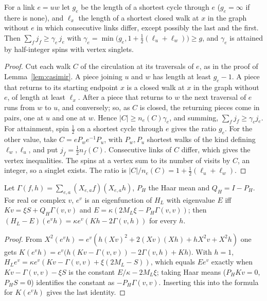 \begin{remark}\label{rem:perlink}
For a link $e=uw$ let $g_e$ be the length of a shortest cycle through $e$ ($g_e=\infty$ if there is none), and $\ell_x$ the length of a shortest closed walk at $x$ in the graph without $e$ in which consecutive links differ, except possibly the last and the first. Then $\sum_fj_f\ge\gamma_e\,j_e$ with $\gamma_e=\min\bigl(g_e,1+\frac12(\ell_u+\ell_w)\bigr)\ge g$, and $\gamma_e$ is attained by half-integer spins with vertex singlets.
\end{remark}
\begin{proof}
Cut each walk $C$ of the circulation at its traversals of $e$, as in the proof of Lemma~\ref{lem:casimir}. A piece joining $u$ and $w$ has length at least $g_e-1$. A piece that returns to its starting endpoint $x$ is a closed walk at $x$ in the graph without $e$, of length at least $\ell_x$. After a piece that returns to $w$ the next traversal of $e$ runs from $w$ to $u$, and conversely; so, as $C$ is closed, the returning pieces come in pairs, one at $u$ and one at $w$. Hence $|C|\ge n_e(C)\gamma_e$, and summing, $\sum_fj_f\ge\gamma_ej_e$.
For attainment, spin $\frac12$ on a shortest cycle through $e$ gives the ratio $g_e$. For the other value, take $C=eP_we^{-1}P_u$, with $P_w,P_u$ shortest walks of the kind defining $\ell_w,\ell_u$, and put $j_f=\frac12n_f(C)$. Consecutive links of $C$ differ, which gives the vertex inequalities. The spins at a vertex sum to its number of visits by $C$, an integer, so a singlet exists. The ratio is $|C|/n_e(C)=1+\frac12(\ell_u+\ell_w)$.
\end{proof}

\begin{lemma}\label{lem:gst}
Let $\Gamma(f,h)=\sum_{e,a}(X_{e,a}f)(X_{e,a}h)$, $P_H$ the Haar mean and $Q_H=I-P_H$. For real or complex $v$, $e^v$ is an eigenfunction of $H_L$ with eigenvalue $E$ iff $Kv=\xi S+Q_H\Gamma(v,v)$ and $E=\kappa(2M_L\xi-P_H\Gamma(v,v))$; then $(H_L-E)(e^vh)=\kappa e^v(Kh-2\Gamma(v,h))$ for every $h$.
\end{lemma}
\begin{proof}
From $X^2(e^vh)=e^v(h(Xv)^2+2(Xv)(Xh)+hX^2v+X^2h)$ one gets $K(e^vh)=e^v\bigl(h(Kv-\Gamma(v,v))-2\Gamma(v,h)+Kh\bigr)$. With $h=1$, $H_Le^v=\kappa e^v(Kv-\Gamma(v,v)+\xi(2M_L-S))$, which equals $Ee^v$ exactly when $Kv-\Gamma(v,v)-\xi S$ is the constant $E/\kappa-2M_L\xi$; taking Haar means ($P_HKv=0$, $P_HS=0$) identifies the constant as $-P_H\Gamma(v,v)$. Inserting this into the formula for $K(e^vh)$ gives the last identity.
\end{proof}

